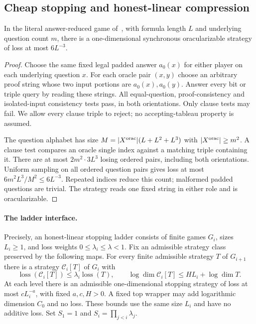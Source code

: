 \subsection{Cheap stopping and honest-linear compression}
\begin{lemma}\label{lem:cheap}
In the literal answer-reduced game of~\cite[Table 5]{MNY}, with formula length $L$ and underlying question count $m$, there is a one-dimensional synchronous oracularizable strategy of loss at most $6L^{-3}$.
\end{lemma}
\begin{proof}
Choose the same fixed legal padded answer $a_0(x)$ for either player on each underlying question $x$. For each oracle pair $(x,y)$ choose an arbitrary proof string whose two input portions are $a_0(x),a_0(y)$. Answer every bit or triple query by reading these strings. All equal-question, proof-consistency and isolated-input consistency tests pass, in both orientations. Only clause tests may fail. We allow every clause triple to reject; no accepting-tableau property is assumed.

The question alphabet has size $M=|X^{\rm orac}|(L+L^2+L^3)$ with $|X^{\rm orac}|\ge m^2$. A clause test compares an oracle single index against a matching triple containing it. There are at most $2m^2\cdot3L^3$ losing ordered pairs, including both orientations. Uniform sampling on all ordered question pairs gives loss at most $6m^2L^3/M^2\le6L^{-3}$. Repeated indices reduce this count; malformed padded questions are trivial. The strategy reads one fixed string in either role and is oracularizable.
\end{proof}

\paragraph{The ladder interface.}
Precisely, an honest-linear stopping ladder consists of finite games $G_i$, sizes $L_i\ge1$, and loss weights $0\le\lambda_i\le\lambda<1$. Fix an admissible strategy class preserved by the following maps. For every finite admissible strategy $T$ of $G_{i+1}$ there is a strategy $\mathcal C_i[T]$ of $G_i$ with
\[
 \operatorname{loss}(\mathcal C_i[T])\le\lambda_i\operatorname{loss}(T),\qquad
 \log\dim\mathcal C_i[T]\le HL_i+\log\dim T.
\]
At each level there is an admissible one-dimensional stopping strategy of loss at most $cL_i^{-a}$, with fixed $a,c,H>0$. A fixed top wrapper may add logarithmic dimension $C_0$ and no loss. These bounds use the same size $L_i$ and have no additive loss. Set $S_1=1$ and $S_i=\prod_{j<i}\lambda_j$.

